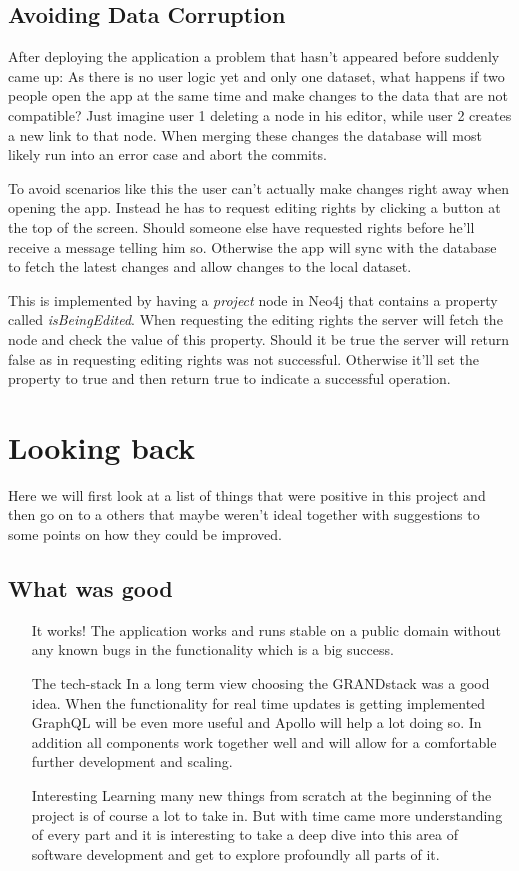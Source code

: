\section{Avoiding Data Corruption}
After deploying the application a problem that hasn't appeared before suddenly came up: As there is no user logic yet and only one dataset, what happens if two people open the app at the same time and make changes to the data that are not compatible? Just imagine user 1 deleting a node in his editor, while user 2 creates a new link to that node. When merging these changes the database will most likely run into an error case and abort the commits.

To avoid scenarios like this the user can't actually make changes right away when opening the app. Instead he has to request editing rights by clicking a button at the top of the screen. Should someone else have requested rights before he'll receive a message telling him so. Otherwise the app will sync with the database to fetch the latest changes and allow changes to the local dataset.

This is implemented by having a \emph{project} node in Neo4j that contains a property called \emph{isBeingEdited}. When requesting the editing rights the server will fetch the node and check the value of this property. Should it be true the server will return false as in requesting editing rights was not successful. Otherwise it'll set the property to true and then return true to indicate a successful operation.

\chapter{Looking back}
\label{chap:LB}
Here we will first look at a list of things that were positive in this project and then go on to a others that maybe weren't ideal together with suggestions to some points on how they could be improved.

\section{What was good}
\begin{itemize}
\item[It works!] The application works and runs stable on a public domain without any known bugs in the functionality which is a big success.
\item[The tech-stack] In a long term view choosing the GRANDstack was a good idea. When the functionality for real time updates is getting implemented GraphQL will be even more useful and Apollo will help a lot doing so. In addition all components work together well and will allow for a comfortable further development and scaling.
\item[Interesting] Learning many new things from scratch at the beginning of the project is of course a lot to take in. But with time came more understanding of every part and it is interesting to take a deep dive into this area of software development and get to explore profoundly all parts of it.
\end{itemize}

